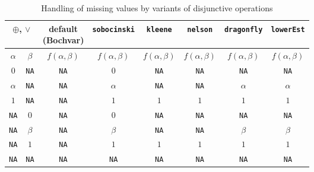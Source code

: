 \documentclass[review]{elsarticle}
\newcommand{\code}[1]{\texttt{#1}}
\begin{document}
\begin{table}
    \centering
    \caption{Handling of missing values by variants of disjunctive operations}
    \label{tab:disjunctions}
    \begin{tabular}{cc|cccccc}
        \multicolumn{2}{c|}{$\oplus$, $\lor$} & \makecell{default \\ (Bochvar)} & \texttt{sobocinski} & \texttt{kleene} & \texttt{nelson} & \texttt{dragonfly} & \texttt{lowerEst} \\
        \hline
        $\alpha$    & $\beta$     & $f(\alpha, \beta)$ & $f(\alpha, \beta)$ & $f(\alpha, \beta)$ & $f(\alpha, \beta)$ & $f(\alpha, \beta)$ & $f(\alpha, \beta)$ \\
        $0$         & \code{NA} & \code{NA} & $0$         & \code{NA} & \code{NA} & \code{NA} & \code{NA} \\
        $\alpha$    & \code{NA} & \code{NA} & $\alpha$    & \code{NA} & \code{NA} & $\alpha$    & $\alpha$    \\
        $1$         & \code{NA} & \code{NA} & $1$         & $1$         & $1$         & $1$         & $1$         \\
        \code{NA} & $0$         & \code{NA} & $0$         & \code{NA} & \code{NA} & \code{NA} & \code{NA} \\
        \code{NA} & $\beta$     & \code{NA} & $\beta$     & \code{NA} & \code{NA} & $\beta$     & $\beta$     \\
        \code{NA} & $1$         & \code{NA} & $1$         & $1$         & $1$         & $1$         & $1$         \\
        \code{NA} & \code{NA} & \code{NA} & \code{NA} & \code{NA} & \code{NA} & \code{NA} & \code{NA} 
    \end{tabular}
\end{table}
\end{document}
